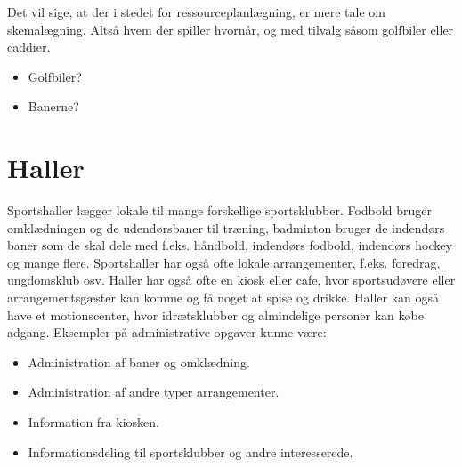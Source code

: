 Det vil sige, at der i stedet for ressourceplanlægning, er mere tale om skemalægning. Altså hvem der spiller hvornår, og med tilvalg såsom golfbiler eller caddier.
\begin{itemize}
\item Golfbiler?
\item Banerne?
\end{itemize}

\section{Haller}
Sportshaller lægger lokale til mange forskellige sportsklubber. Fodbold bruger omklædningen og de udendørsbaner til træning, badminton bruger de indendørs baner som de skal dele med f.eks. håndbold, indendørs fodbold, indendørs hockey og mange flere. Sportshaller har også ofte lokale arrangementer, f.eks. foredrag, ungdomsklub osv. 
Haller har også ofte en kiosk eller cafe, hvor sportsudøvere eller arrangementsgæster kan komme og få noget at spise og drikke. 
Haller kan også have et motionscenter, hvor idrætsklubber og almindelige personer kan købe adgang. 
Eksempler på administrative opgaver kunne være:
\begin{itemize}
\item Administration af baner og omklædning.
\item Administration af andre typer arrangementer.
\item Information fra kiosken.
\item Informationsdeling til sportsklubber og andre interesserede.
\end{itemize}
